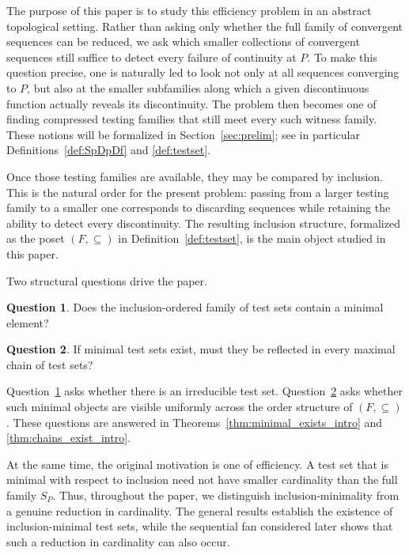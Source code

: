 \documentclass[11pt]{amsart}
\theoremstyle{plain}
\theoremstyle{definition}
\newtheorem{question}{Question}[section]
\theoremstyle{remark}
\newcommand{\Sp}{\mathcal{S}_P}
\newcommand{\F}{\mathcal{F}}
\def\Sp{S_P}%
\def\F{F}%
\begin{document}
The purpose of this paper is to study this efficiency problem in an abstract topological setting.
Rather than asking only whether the full family of convergent sequences can be reduced, we ask which smaller collections of convergent sequences still suffice to detect every failure of continuity at $P$.
To make this question precise, one is naturally led to look not only at all sequences converging to $P$, but also at the smaller subfamilies along which a given discontinuous function actually reveals its discontinuity.
The problem then becomes one of finding compressed testing families that still meet every such witness family.
These notions will be formalized in Section~\ref{sec:prelim}; see in particular Definitions~\ref{def:SpDpDf} and \ref{def:testset}.

Once those testing families are available, they may be compared by inclusion.
This is the natural order for the present problem:
passing from a larger testing family to a smaller one corresponds to discarding sequences while retaining the ability to detect every discontinuity.
The resulting inclusion structure, formalized as the poset $(\F,\subseteq)$ in Definition~\ref{def:testset}, is the main object studied in this paper.

Two structural questions drive the paper.

\begin{question}\label{q:minimal_exists}
Does the inclusion-ordered family of test sets contain a minimal element?
\end{question}

\begin{question}\label{q:chains_reflect}
If minimal test sets exist, must they be reflected in every maximal chain of test sets?
\end{question}

Question~\ref{q:minimal_exists} asks whether there is an irreducible test set.
Question~\ref{q:chains_reflect} asks whether such minimal objects are visible uniformly across the order structure of $(\F,\subseteq)$.
These questions are answered in Theorems~\ref{thm:minimal_exists_intro} and \ref{thm:chains_exist_intro}.

At the same time, the original motivation is one of efficiency.
A test set that is minimal with respect to inclusion need not have smaller cardinality than the full family $\Sp$.
Thus, throughout the paper, we distinguish inclusion-minimality from a genuine reduction in cardinality.
The general results establish the existence of inclusion-minimal test sets, while the sequential fan considered later shows that such a reduction in cardinality can also occur.
\end{document}
